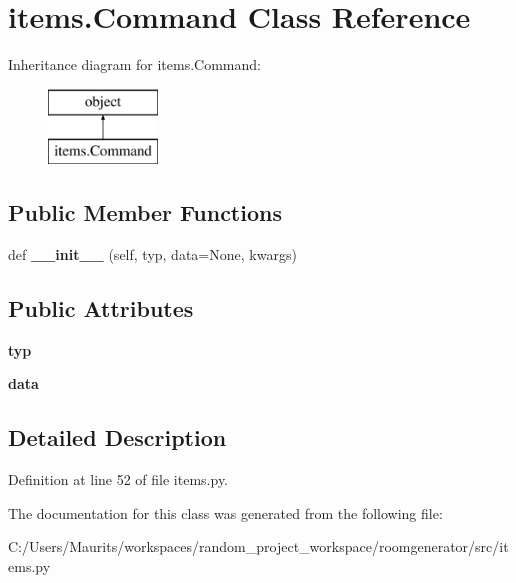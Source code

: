 \hypertarget{classitems_1_1_command}{}\section{items.\+Command Class Reference}
\label{classitems_1_1_command}
Inheritance diagram for items.\+Command\+:\begin{figure}[H]
\begin{center}
\leavevmode
\includegraphics[height=2.000000cm]{classitems_1_1_command}
\end{center}
\end{figure}
\subsection*{Public Member Functions}
\begin{DoxyCompactItemize}
\item 
\hypertarget{classitems_1_1_command_a6eeb22e8d48035c196d41bca7dcc9e26}{}def {\bfseries \+\_\+\+\_\+init\+\_\+\+\_\+} (self, typ, data=None, kwargs)\label{classitems_1_1_command_a6eeb22e8d48035c196d41bca7dcc9e26}

\end{DoxyCompactItemize}
\subsection*{Public Attributes}
\begin{DoxyCompactItemize}
\item 
\hypertarget{classitems_1_1_command_a653987d5c7486f9717c367f9ea32a531}{}{\bfseries typ}\label{classitems_1_1_command_a653987d5c7486f9717c367f9ea32a531}

\item 
\hypertarget{classitems_1_1_command_ae32c004e02e093045ba9efd912a461fa}{}{\bfseries data}\label{classitems_1_1_command_ae32c004e02e093045ba9efd912a461fa}

\end{DoxyCompactItemize}


\subsection{Detailed Description}


Definition at line 52 of file items.\+py.



The documentation for this class was generated from the following file\+:\begin{DoxyCompactItemize}
\item 
C\+:/\+Users/\+Maurits/workspaces/random\+\_\+project\+\_\+workspace/roomgenerator/src/items.\+py\end{DoxyCompactItemize}
